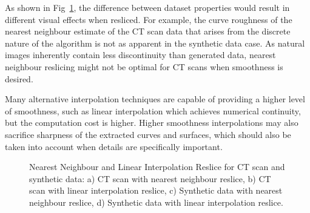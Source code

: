 \documentclass[11pt, twocolumn]{article}
\begin{document}
As shown in Fig~\ref{fig:reslice}, the difference between dataset properties would result in different visual effects when resliced. For example, the curve roughness of the nearest neighbour estimate of the CT scan data that arises from the discrete nature of the algorithm is not as apparent in the synthetic data case. As natural images inherently contain less discontinuity than generated data, nearest neighbour reslicing might not be optimal for CT scans when smoothness is desired.

Many alternative interpolation techniques are capable of providing a higher level of smoothness, such as linear interpolation which achieves numerical continuity, but the computation cost is higher. Higher smoothness interpolations may also sacrifice sharpness of the extracted curves and surfaces, which should also be taken into account when details are specifically important.
\begin{figure}[ht]
    \centering
    \caption{Nearest Neighbour and Linear Interpolation Reslice for CT scan and synthetic data: a) CT scan with nearest neighbour reslice, b) CT scan with linear interpolation reslice, c) Synthetic data with nearest neighbour reslice, d) Synthetic data with linear interpolation reslice.}
    \label{fig:reslice}
\end{figure}
\vspace{-1em}
\end{document}
